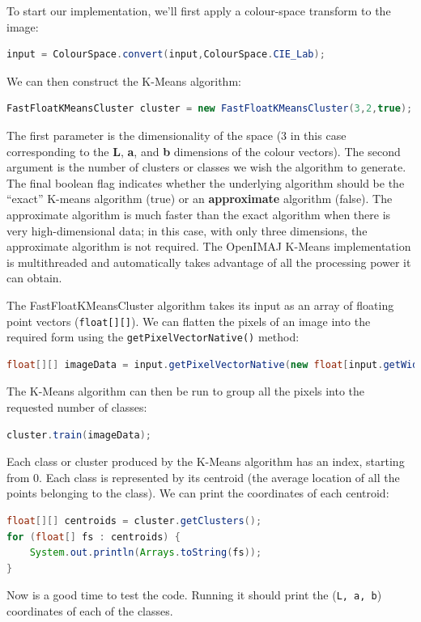 \documentclass[10pt,a4paper,twoside,extrafontsizes]{memoir}
\begin{document}
\pagebreak
To start our implementation, we'll first apply a colour-space transform to the image:
\begin{lstlisting}[language=java]
input = ColourSpace.convert(input,ColourSpace.CIE_Lab);
\end{lstlisting}
We can then construct the K-Means algorithm:
\begin{lstlisting}[language=java]
FastFloatKMeansCluster cluster = new FastFloatKMeansCluster(3,2,true);
\end{lstlisting}
The first parameter is the dimensionality of the space (3 in this case corresponding 
to the \textbf{L}, \textbf{a}, and \textbf{b} dimensions of the colour vectors). The second 
argument is the number of clusters or classes we wish the algorithm to generate. The final 
boolean flag indicates whether the underlying algorithm should be the ``exact'' K-means algorithm (true) or an 
\textbf{approximate} algorithm (false). The approximate algorithm is much faster than the exact 
algorithm when there is very high-dimensional data; in this case, with only three dimensions, 
the approximate algorithm is not required. The OpenIMAJ K-Means implementation is 
multithreaded and automatically takes advantage of all the processing power it can obtain.

The FastFloatKMeansCluster algorithm takes its input as an array of floating point vectors
(\verb+float[][]+). We can flatten the pixels of an image into the required form using the 
\verb+getPixelVectorNative()+ method:
\begin{lstlisting}[language=java]
float[][] imageData = input.getPixelVectorNative(new float[input.getWidth() * input.getHeight()][3]);
\end{lstlisting}
The K-Means algorithm can then be run to group all the pixels into the requested number of classes:
\begin{lstlisting}[language=java]
cluster.train(imageData);
\end{lstlisting}
Each class or cluster produced by the K-Means algorithm has an index, starting from 0. Each class is 
represented by its centroid (the average location of all the points belonging to the class). We can 
print the coordinates of each centroid:
\begin{lstlisting}[language=java]
float[][] centroids = cluster.getClusters();
for (float[] fs : centroids) {
    System.out.println(Arrays.toString(fs));
}
\end{lstlisting}
Now is a good time to test the code. Running it should print the (\verb+L, a, b+) coordinates of each 
of the classes.
\end{document}
